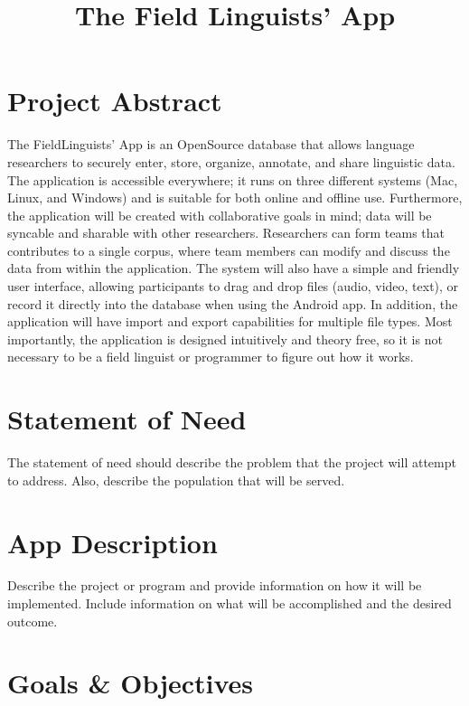 \documentclass[12 pt]{article}
\title{The Field Linguists' App}
\author{}
\date{}
\begin{document}
\maketitle{}

\section {Project Abstract}

The FieldLinguists' App is an OpenSource database that allows language researchers to securely enter, store, organize, annotate, and share linguistic data. The application is accessible everywhere; it runs on three different systems (Mac, Linux, and Windows)  and is suitable for both online and offline use.  Furthermore, the application will be created with collaborative goals in mind;  data will be syncable and sharable with other researchers.  Researchers can form teams that contributes to a single corpus, where team members can modify and discuss the data from within the application. The system will also have a simple and friendly user interface, allowing participants to drag and drop files (audio, video, text), or record it directly into the database when using the Android app. In addition, the application will have import and export capabilities for multiple file types.  Most importantly, the application is designed intuitively and theory free, so it is not necessary to be a field linguist or programmer to figure out how it works.

\section {Statement of Need}

The statement of need should describe the problem that the project will attempt to address. Also, 
describe the population that will be served.  

\section {App Description}

Describe the project or program and provide information on how it will be implemented. Include 
information on what will be accomplished and the desired outcome. 

\section {Goals \& Objectives}
\end{document}
